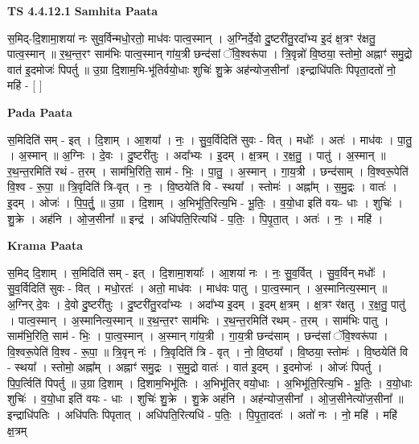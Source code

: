 \documentclass[17pt]{extarticle}
\begin{document}
\textbf{TS 4.4.12.1 } \newline
\textbf{Samhita Paata} \newline

स॒मिद्-दि॒शामा॒शया॑ नः सुव॒र्विन्मधो॒रतो॒ माध॑वः पात्व॒स्मान् । अ॒ग्निर्दे॒वो दु॒ष्टरी॑तु॒रदा᳚भ्य इ॒दं क्ष॒त्रꣳ र॑क्षतु॒ पात्व॒स्मान् ॥ र॒थ॒न्त॒रꣳ साम॑भिः पात्व॒स्मान् गा॑य॒त्री छन्द॑सां ॅवि॒श्वरू॑पा । त्रि॒वृन्नो॑ वि॒ष्ठया॒ स्तोमो॒ अह्नाꣳ॑ समु॒द्रो वात॑ इ॒दमोजः॑ पिपर्तु ॥ उ॒ग्रा दि॒शाम॒भि-भू॑तिर्वयो॒धाः शुचिः॑ शु॒क्रे अह॑न्योज॒सीना᳚ ।इन्द्राधि॑पतिः पिपृता॒दतो॑ नो॒ महि॑ - [  ] \newline

\textbf{Pada Paata} \newline

स॒मिदिति॑ सम् - इत् । दि॒शाम् । आ॒शया᳚ । नः॒ । सु॒व॒र्विदिति॑ सुवः - वित् । मधोः᳚ । अतः॑ । माध॑वः । पा॒तु॒ । अ॒स्मान् ॥ अ॒ग्निः । दे॒वः । दु॒ष्टरी॑तुः । अदा᳚भ्यः । इ॒दम् । क्ष॒त्रम् । र॒क्ष॒तु॒ । पातु॑ । अ॒स्मान् ॥ र॒थ॒न्त॒रमिति॑ रथं - त॒रम् । साम॑भि॒रिति॒ साम॑ - भिः॒ । पा॒तु॒ । अ॒स्मान् । गा॒य॒त्री । छन्द॑साम् । वि॒श्वरू॒पेति॑ वि॒श्व - रू॒पा॒ ॥ त्रि॒वृदिति॑ त्रि-वृत् । नः॒ । वि॒ष्ठयेति॑ वि - स्थया᳚ । स्तोमः॑ । अह्ना᳚म् । स॒मु॒द्रः । वातः॑ । इ॒दम् । ओजः॑ । पि॒प॒र्तु॒ ॥ उ॒ग्रा । दि॒शाम् । अ॒भिभू॑ति॒रित्य॒भि - भू॒तिः॒ । व॒यो॒धा इति॑ वयः- धाः । शुचिः॑ । शु॒क्रे । अह॑नि । ओ॒ज॒सीना᳚ ॥ इन्द्र॑ । अधि॑पति॒रित्यधि॑ - प॒तिः॒ । पि॒पृ॒ता॒त् । अतः॑ । नः॒ । महि॑ ।  \newline


\textbf{Krama Paata} \newline

स॒मिद् दि॒शाम् । स॒मिदिति॑ सम् - इत् । दि॒शामा॒शयाः᳚ । आ॒शया॑ नः । नः॒ सु॒व॒र्वित् । सु॒व॒र्विन् मधोः᳚ । सु॒व॒र्विदिति॑ सुवः - वित् । मधो॒रतः॑ । अतो॒ माध॑वः । माध॑वः पातु । पा॒त्व॒स्मान् । अ॒स्मानित्य॒स्मान् ॥ अ॒ग्निर् दे॒वः । दे॒वो दु॒ष्टरी॑तुः । दु॒ष्टरी॑तु॒रदा᳚भ्यः । अदा᳚भ्य इ॒दम् । इ॒दम् क्ष॒त्रम् । क्ष॒त्रꣳ र॑क्षतु । र॒क्ष॒तु॒ पातु॑ । पात्व॒स्मान् । अ॒स्मानित्य॒स्मान् ॥ र॒थ॒न्त॒रꣳ साम॑भिः । र॒थ॒न्त॒रमिति॑ रथम् - त॒रम् । साम॑भिः पातु । साम॑भि॒रिति॒ साम॑ - भिः॒ । पा॒त्व॒स्मान् । अ॒स्मान् गा॑य॒त्री । गा॒य॒त्री छन्द॑साम् । छन्द॑सां ॅवि॒श्वरू॑पा । वि॒श्वरू॒पेति॑ वि॒श्व - रू॒पा॒ ॥ त्रि॒वृन् नः॑ । त्रि॒वृदिति॑ त्रि - वृत् । नो॒ वि॒ष्ठया᳚ । वि॒ष्ठया॒ स्तोमः॑ । वि॒ष्ठयेति॑ वि - स्थया᳚ । स्तोमो॒ अह्ना᳚म् । अह्नाꣳ॑ समु॒द्रः । स॒मु॒द्रो वातः॑ । वात॑ इ॒दम् । इ॒दमोजः॑ । ओजः॑ पिपर्तु । पि॒प॒र्त्विति॑ पिपर्तु ॥ उ॒ग्रा दि॒शाम् । दि॒शाम॒भिभू॑तिः । अ॒भिभू॑तिर् वयो॒धाः । अ॒भिभू॑ति॒रित्य॒भि - भू॒तिः॒ । व॒यो॒धाः शुचिः॑ । व॒यो॒धा इति॑ वयः - धाः । शुचिः॑ शु॒क्रे । शु॒क्रे अह॑नि । अह॑न्योज॒सीना᳚ । ओ॒ज॒सीनेत्यो॑ज॒सीना᳚ ॥ इन्द्राधि॑पतिः । अधि॑पतिः पिपृतात् । अधि॑पति॒रित्यधि॑ - प॒तिः॒ । पि॒पृ॒ता॒दतः॑ । अतो॑ नः । नो॒ महि॑ । महि॑ क्ष॒त्रम् \newline
\end{document}
